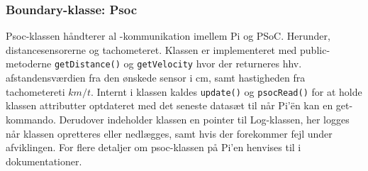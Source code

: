 \subsubsection{Boundary-klasse: Psoc} \label{sec:psoc_klasse}

Psoc-klassen håndterer al \IIC-kommunikation imellem Pi og PSoC. Herunder, distancesensorerne og tachometeret. 
Klassen er implementeret med public-metoderne \texttt{getDistance()} og \texttt{getVelocity} hvor der returneres hhv. afstandensværdien fra den ønskede sensor i cm, samt hastigheden fra tachometereti $km/t$. 
Internt i klassen kaldes \texttt{update()} og \texttt{psocRead()} for at holde klassen attributter optdateret med det seneste datasæt til når Pi'ën kan en get-kommando. 
Derudover indeholder klassen en pointer til Log-klassen, her logges når klassen opretteres eller nedlægges, samt hvis der forekommer fejl under afviklingen. For flere detaljer om psoc-klassen på Pi'en henvises til  i dokumentationer.
